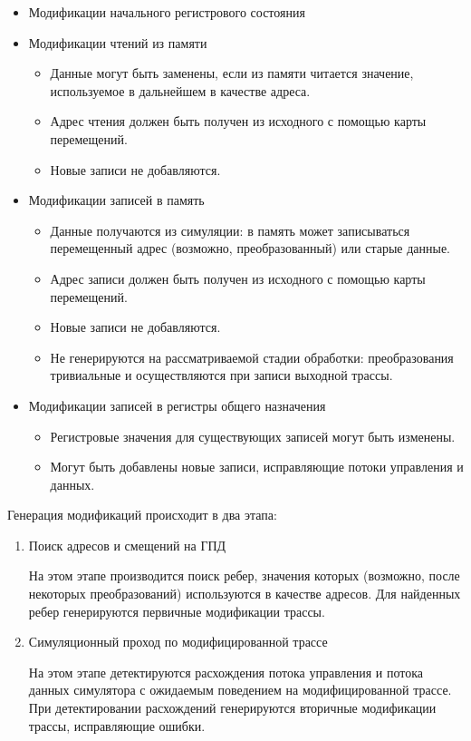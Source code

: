 \begin{itemize}
    \item Модификации начального регистрового состояния

    \item Модификации чтений из памяти

    \begin{itemize}
        \item Данные могут быть заменены, если из памяти читается значение, используемое в дальнейшем в качестве адреса.
        \item Адрес чтения должен быть получен из исходного с помощью карты перемещений.
        \item Новые записи не добавляются.
    \end{itemize}

    \item Модификации записей в память

    \begin{itemize}
        \item Данные получаются из симуляции: в память может записываться перемещенный адрес (возможно, преобразованный) или старые данные.
        \item Адрес записи должен быть получен из исходного с помощью карты перемещений.
        \item Новые записи не добавляются.
        \item Не генерируются на рассматриваемой стадии обработки: преобразования тривиальные и осуществляются при записи выходной трассы.
    \end{itemize}

    \item Модификации записей в регистры общего назначения

    \begin{itemize}
        \item Регистровые значения для существующих записей могут быть изменены.
        \item Могут быть добавлены новые записи, исправляющие потоки управления и данных.
    \end{itemize}
\end{itemize}

Генерация модификаций происходит в два этапа:

\begin{enumerate}
    \item Поиск адресов и смещений на ГПД

    На этом этапе производится поиск ребер, значения которых (возможно, после некоторых преобразований) используются в качестве адресов. Для найденных ребер генерируются первичные модификации трассы.

    \item Симуляционный проход по модифицированной трассе

    На этом этапе детектируются расхождения потока управления и потока данных симулятора с ожидаемым поведением на модифицированной трассе. При детектировании расхождений генерируются вторичные модификации трассы, исправляющие ошибки.
\end{enumerate}

